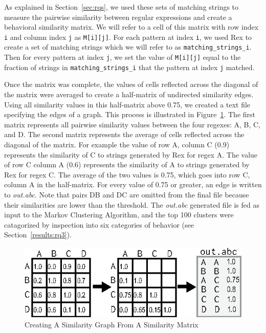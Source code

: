 As explained in Section~\ref{sec:rqs}, we used these sets of matching strings to  measure the pairwise similarity between regular expressions and create a behavioral similarity matrix.  We will refer to a cell of this matrix with row index {\tt i} and column index {\tt j} as {\tt M[i][j]}.  For each pattern at index {\tt i}, we used Rex to create a set of matching strings which we will refer to as {\tt matching\_strings\_i}.  Then for every pattern at index {\tt j}, we set the value of {\tt M[i][j]} equal to the fraction of strings in {\tt matching\_strings\_i} that the pattern at index {\tt j} matched.

Once the matrix was complete, the values of cells reflected across the diagonal of the matrix were averaged to create a half-matrix of undirected similarity edges.  Using all similarity values in this half-matrix above 0.75, we created a text file specifying the edges of a graph.  This process is illustrated in Figure~\ref{fig:matrixToGraph}.
The first matrix represents all pairwise similarity values between the four regexes: A, B, C, and D.  The second matrix represents the average of cells reflected across the diagonal of the matrix.  For example the value of row A, column C (0.9) represents the similarity of C to strings generated by Rex for regex A.  The value of row C column A (0.6) represents the similarity of A to strings generated by Rex for regex C.  The average of the two values is 0.75, which goes into row C, column A in the half-matrix.  For every value of 0.75 or greater, an edge is written to \emph{out.abc}.
Note that pairs DB and DC are omitted from the final file because their similarities are lower than the threshold.  The \emph{out.abc} generated file  is fed as input to the Markov Clustering Algorithm, and the top 100 clusters were catagorized by inspection into six categories of behavior (see Section~\ref{results:rq3}). 


\begin{figure}[tb]
\centering
\includegraphics[width=\columnwidth]{../illustrations/matrixToGraph.eps}
\caption{Creating A Similarity Graph From A Similarity Matrix}
\label{fig:matrixToGraph}
\end{figure}
\

